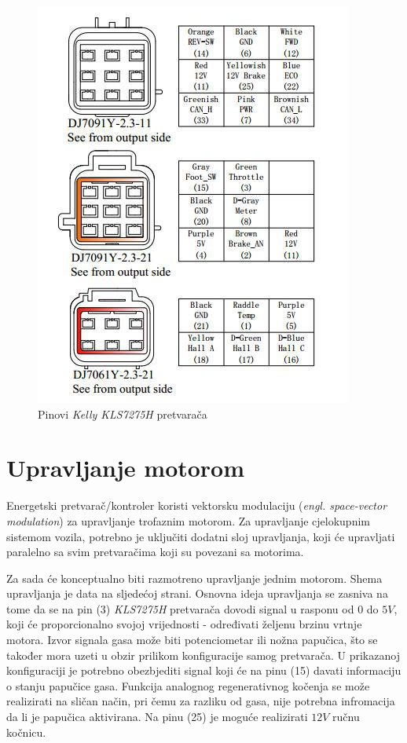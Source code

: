 \begin{figure}
\begin{center}
\includegraphics[scale=1]{slike/kellypins.jpg}
\end{center}
\caption{Pinovi \textit{Kelly KLS7275H} pretvarača}
\label{fig:kellypins}
\end{figure}

\section{Upravljanje motorom}

\qquad Energetski pretvarač/kontroler koristi vektorsku modulaciju (\textit{engl. space-vector modulation}) za upravljanje trofaznim motorom. Za upravljanje cjelokupnim sistemom vozila, potrebno je uključiti dodatni sloj upravljanja, koji će upravljati paralelno sa svim pretvaračima koji su povezani sa motorima.

Za sada će konceptualno biti razmotreno upravljanje jednim motorom. Shema upravljanja je data na sljedećoj strani. Osnovna ideja upravljanja se zasniva na tome da se na pin (3) \textit{KLS7275H} pretvarača dovodi signal u rasponu od $0$ do $5V$, koji će proporcionalno svojoj vrijednosti - određivati željenu brzinu vrtnje motora. Izvor signala gasa može biti potenciometar ili nožna papučica, što se također mora uzeti u obzir prilikom konfiguracije samog pretvarača. U prikazanoj konfiguraciji je potrebno obezbjediti signal koji će na pinu (15) davati informaciju o stanju papučice gasa. Funkcija analognog regenerativnog kočenja se može realizirati na sličan način, pri čemu za razliku od gasa, nije potrebna infromacija da li je papučica aktivirana. Na pinu (25) je moguće realizirati $12V$ ručnu kočnicu.

